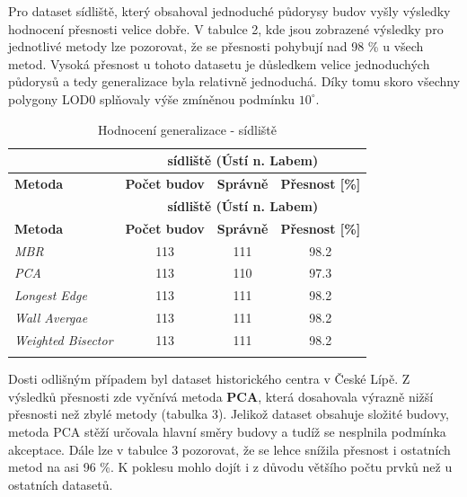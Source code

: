 \documentclass[12pt, a4paper]{article}
\begin{document}
Pro dataset sídliště, který obsahoval jednoduché půdorysy budov vyšly výsledky hodnocení přesnosti velice dobře. V tabulce 2, kde jsou zobrazené výsledky pro jednotlivé metody lze pozorovat, že se přesnosti pohybují nad 98 \% u všech metod. Vysoká přesnost u tohoto datasetu je důsledkem velice jednoduchých půdorysů a tedy generalizace byla relativně jednoduchá. Díky tomu skoro všechny polygony LOD0 splňovaly výše zmíněnou podmínku $10^{\circ}$.
\begin{small}
\begin{longtable}{|l|c|c|c|}
    \hline
    & \multicolumn{3}{c|}{\textbf{sídliště (Ústí n. Labem)}} \\
    \hline
    \textbf{Metoda} & \textbf{Počet budov} & \textbf{Správně} & \textbf{Přesnost [\%]} \\
    \hline
    \endfirsthead
    
    \hline
    & \multicolumn{3}{c|}{\textbf{sídliště (Ústí n. Labem)}} \\
    \hline
    \textbf{Metoda} & \textbf{Počet budov} & \textbf{Správně} & \textbf{Přesnost [\%]} \\
    \hline
    \endhead

    \textit{MBR} & 113 & 111 & 98.2 \\
    \hline
    \textit{PCA} & 113 & 110 & 97.3 \\
    \hline
    \textit{Longest Edge} & 113 & 111 & 98.2 \\
    \hline
    \textit{Wall Avergae} & 113 & 111 & 98.2 \\
    \hline
    \textit{Weighted Bisector} & 113 & 111 & 98.2 \\
    \hline
    \caption{Hodnocení generalizace - sídliště}
    
\end{longtable}
\end{small}
Dosti odlišným případem byl dataset historického centra v České Lípě. Z výsledků přesnosti zde vyčnívá metoda \textbf{PCA}, která dosahovala výrazně nižší přesnosti než zbylé metody (tabulka 3). Jelikož dataset obsahuje složité budovy, metoda PCA stěží určovala hlavní směry budovy a tudíž se nesplnila podmínka akceptace. Dále lze v tabulce 3 pozorovat, že se lehce snížila přesnost i ostatních metod na asi 96 \%. K poklesu mohlo dojít i z důvodu většího počtu prvků než u ostatních datasetů.
\end{document}
